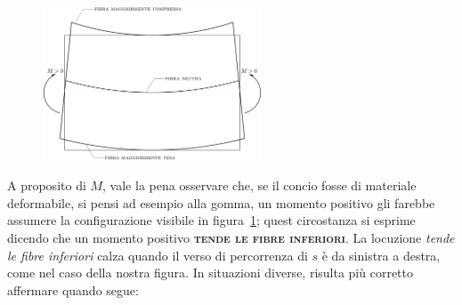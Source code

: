 \renewcommand{\thefigure}{12~-~3}
\begin{figure}[ht]
\centering
\includegraphics[width=0.58\textwidth]{Immagini/Parte_12/Figura12_3/figura12_3.pdf}
\caption{}
\label{figura12-3}
\end{figure}
A proposito di $M$, vale la pena osservare che, se il concio fosse di materiale deformabile, si pensi ad esempio alla gomma, un momento positivo gli farebbe assumere la configurazione visibile in figura~\ref{figura12-3}; quest circostanza si esprime dicendo che un momento positivo \textbf{\textsc{tende le fibre inferiori}}. La locuzione \emph{tende le fibre inferiori} calza quando il verso di percorrenza di $s$ è da sinistra a destra, come nel caso della nostra figura. In situazioni diverse, risulta più corretto affermare quando segue:
\\

\\
